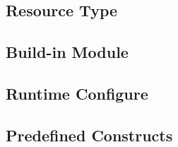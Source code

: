 \subsection{Resource Type}


\subsection{Build-in Module}



\subsection{Runtime Configure}


\subsection{Predefined Constructs}




